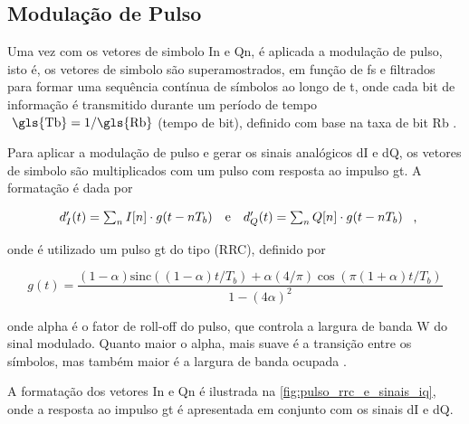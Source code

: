\subsection{Modulação de Pulso}

Uma vez com os vetores de simbolo \gls{In} e \gls{Qn}, é aplicada a modulação de pulso, isto é, os vetores de simbolo são superamostrados, em função de \gls{fs} e filtrados para formar uma sequência contínua de símbolos ao longo de \gls{t}, onde cada bit de informação é transmitido durante um período de tempo $\text{ \gls{Tb}} = 1/ \text{\gls{Rb}}$ (tempo de bit), definido com base na taxa de bit \gls{Rb} \cite{cnes_services_and_message_formats_ed2_rev2_2006}.


Para aplicar a modulação de pulso e gerar os sinais analógicos \gls{dI} e \gls{dQ}, os vetores de simbolo são multiplicados com um pulso com resposta ao impulso \gls{gt}. A formatação é dada por 

\vspace{-1em}
\begin{equation}
    \begin{array}{c@{\quad\text{e}\quad}c}
        d_I'(t) = \sum_{n} I[n] \cdot g(t - nT_b) &
        d_Q'(t) = \sum_{n} Q[n] \cdot g(t - nT_b)
    \end{array} \text{ ,}
\end{equation}

\noindent onde é utilizado um pulso \gls{gt} do tipo (\gls{RRC}), definido por

\begin{equation}
    g(t) = \frac{(1-\alpha) \text{sinc}((1- \alpha) t / T_b) + \alpha(4/\pi) \cos(\pi(1 + \alpha)t/T_b) }{1 - (4\alpha )^2}
\end{equation}

\noindent onde \gls{alpha} é o fator de roll-off do pulso, que controla a largura de banda \gls{W} do sinal modulado. Quanto maior o \gls{alpha}, mais suave é a transição entre os símbolos, mas também maior é a largura de banda ocupada \cite{10555531840}.

A formatação dos vetores \gls{In} e \gls{Qn} é ilustrada na \autoref{fig:pulso_rrc_e_sinais_iq}, onde a resposta ao impulso \gls{gt} é apresentada em conjunto com os sinais \gls{dI} e \gls{dQ}. 

